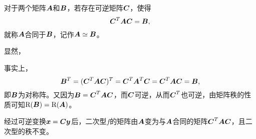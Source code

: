   



\begin{frame}
  
  \begin{dingyi}[矩阵的合同]
    对于两个矩阵$\A$和$\B$，若存在可逆矩阵$\C$，使得
    $$
    \C^T\A\C=\B,
    $$
    就称$\A$合同于$\B$，记作$\A\simeq\B$。
  \end{dingyi}
  
\end{frame}

\begin{frame}
  显然，
  \pause \vspace{.1in}

  事实上，
  $$
  \B^T = (\C^T\A\C)^T = \C^T\A^T\C = \C^T\A\C = \B,
  $$
  即$\B$为对称阵。又因为$\B=\C^T\A\C$，而$\C$可逆，从而$\C^T$也可逆，由矩阵秩的性质可知$\rank(\B)=\rank(\A)$。
\end{frame}

\begin{frame}
  \begin{jielun}

    经过可逆变换$\xx=\C\yy$后，二次型$f$的矩阵由$\A$变为与$\A$合同的矩阵$\C^T\A\C$，且二次型的秩不变。
  \end{jielun}
\end{frame}






